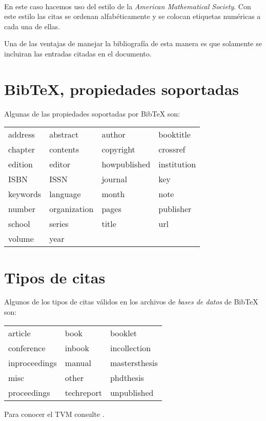 \documentclass[letterpaper,12pt]{book}
\begin{document}
\begin{verbatim}


\end{verbatim}

En este caso hacemos uso del estilo de la \emph{American 
Mathematical Society}. Con este estilo las citas se ordenan
alfabéticamente y se colocan etiquetas numéricas a cada una
de ellas.

Una de las ventajas de manejar la bibliografía de esta manera es
que solamente se incluiran las entradas citadas en el documento.

\newpage 

\section{Bib\TeX{}, propiedades soportadas}

Algunas de las propiedades soportadas por Bib\TeX{} son:

\begin{tabular}{llll}
address & abstract & author & booktitle \\
chapter & contents & copyright & crossref \\
edition & editor & howpublished & institution \\
ISBN & ISSN & journal & key \\
keywords & language & month & note \\
number & organization & pages & publisher \\
school & series & title &url \\
volume & year & & 
\end{tabular}

\section{Tipos de citas}

Algunos de los tipos de citas válidos en los archivos de 
\emph{bases de datos} de Bib\TeX{} son:

\begin{tabular}{lll}
article & book & booklet \\
conference & inbook & incollection \\
inproceedings & manual & mastersthesis \\
misc & other & phdthesis \\
proceedings & techreport & unpublished
\end{tabular}


Para conocer el TVM consulte \cite{spivakCalc}. %


\end{document}
